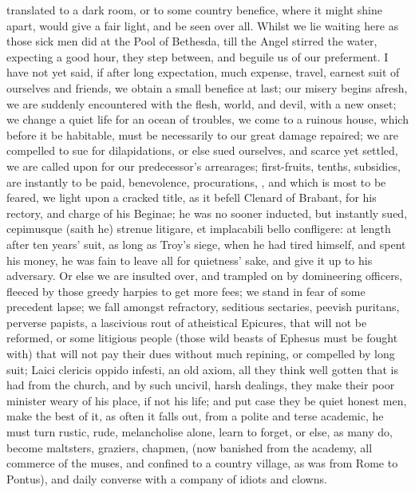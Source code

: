 {translated to a dark room, or to some country benefice, where it might
shine apart, would give a fair light, and be seen over all. Whilst we
lie waiting here as those sick men did at the Pool of  Bethesda,
till the Angel stirred the water, expecting a good hour, they step
between, and beguile us of our preferment. I have not yet said, if
after long expectation, much expense, travel, earnest suit of ourselves
and friends, we obtain a small benefice at last; our misery begins
afresh, we are suddenly encountered with the flesh, world, and devil,
with a new onset; we change a quiet life for an ocean of troubles, we
come to a ruinous house, which before it be habitable, must be
necessarily to our great damage repaired; we are compelled to sue for
dilapidations, or else sued ourselves, and scarce yet settled, we are
called upon for our predecessor's arrearages; first-fruits, tenths,
subsidies, are instantly to be paid, benevolence, procurations, \etc{},
and which is most to be feared, we light upon a cracked title, as it
befell Clenard of Brabant, for his rectory, and charge of his Beginae;
he was no sooner inducted, but instantly sued, cepimusque (saith
he) strenue litigare, et implacabili bello confligere: at length after
ten years' suit, as long as Troy's siege, when he had tired himself,
and spent his money, he was fain to leave all for quietness' sake, and
give it up to his adversary. Or else we are insulted over, and trampled
on by domineering officers, fleeced by those greedy harpies to get more
fees; we stand in fear of some precedent lapse; we fall amongst
refractory, seditious sectaries, peevish puritans, perverse papists, a
lascivious rout of atheistical Epicures, that will not be reformed, or
some litigious people (those wild beasts of Ephesus must be fought
with) that will not pay their dues without much repining, or compelled
by long suit; Laici clericis oppido infesti, an old axiom, all they
think well gotten that is had from the church, and by such uncivil,
harsh dealings, they make their poor minister weary of his place, if
not his life; and put case they be quiet honest men, make the best of
it, as often it falls out, from a polite and terse academic, he must
turn rustic, rude, melancholise alone, learn to forget, or else, as
many do, become maltsters, graziers, chapmen, \etc{} (now banished from
the academy, all commerce of the muses, and confined to a country
village, as \Ovid was from Rome to Pontus), and daily converse with a
company of idiots and clowns.

}
